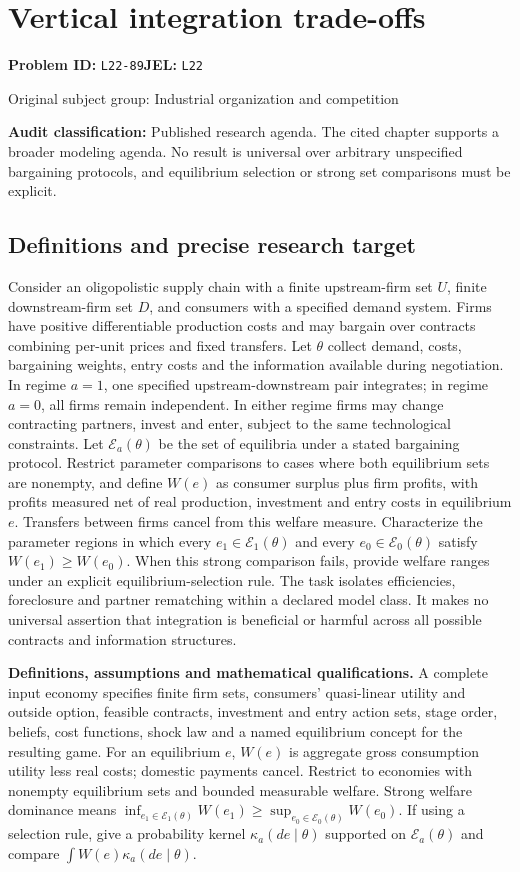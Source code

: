 \documentclass[11pt,a4paper]{article}
\begin{document}
\section*{Vertical integration trade-offs}
\textbf{Problem ID:} \texttt{L22-89}\quad \textbf{JEL:} \texttt{L22}\par
\label{problem:OP-0396}
{\sffamily\small\color{muted}Original subject group: Industrial organization and competition\par}
\label{definitions:problem:30007678}
\textbf{Audit classification:} Published research agenda. The cited chapter supports a broader modeling agenda. No result is universal over arbitrary unspecified bargaining protocols, and equilibrium selection or strong set comparisons must be explicit.
\subsection*{Definitions and precise research target}
Consider an oligopolistic supply chain with a finite upstream-firm set \(U\), finite downstream-firm set \(D\), and consumers with a specified demand system. Firms have positive differentiable production costs and may bargain over contracts combining per-unit prices and fixed transfers. Let \(\theta\) collect demand, costs, bargaining weights, entry costs and the information available during negotiation. In regime \(a=1\), one specified upstream-downstream pair integrates; in regime \(a=0\), all firms remain independent. In either regime firms may change contracting partners, invest and enter, subject to the same technological constraints. Let \(\mathcal E_a(\theta)\) be the set of equilibria under a stated bargaining protocol. Restrict parameter comparisons to cases where both equilibrium sets are nonempty, and define \(W(e)\) as consumer surplus plus firm profits, with profits measured net of real production, investment and entry costs in equilibrium \(e\). Transfers between firms cancel from this welfare measure. Characterize the parameter regions in which every \(e_1\in\mathcal E_1(\theta)\) and every \(e_0\in\mathcal E_0(\theta)\) satisfy \(W(e_1)\geq W(e_0)\). When this strong comparison fails, provide welfare ranges under an explicit equilibrium-selection rule. The task isolates efficiencies, foreclosure and partner rematching within a declared model class. It makes no universal assertion that integration is beneficial or harmful across all possible contracts and information structures.

\textbf{Definitions, assumptions and mathematical qualifications.} A complete input economy specifies finite firm sets, consumers' quasi-linear utility and outside option, feasible contracts, investment and entry action sets, stage order, beliefs, cost functions, shock law and a named equilibrium concept for the resulting game. For an equilibrium \(e\), \(W(e)\) is aggregate gross consumption utility less real costs; domestic payments cancel. Restrict to economies with nonempty equilibrium sets and bounded measurable welfare. Strong welfare dominance means \(\inf_{e_1\in\mathcal E_1(\theta)}W(e_1)\geq\sup_{e_0\in\mathcal E_0(\theta)}W(e_0)\). If using a selection rule, give a probability kernel \(\kappa_a(de\mid\theta)\) supported on \(\mathcal E_a(\theta)\) and compare \(\int W(e)\kappa_a(de\mid\theta)\).
\end{document}

